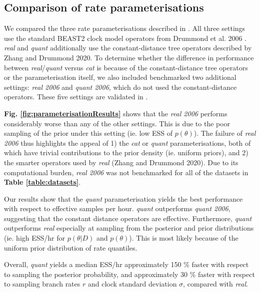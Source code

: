 \documentclass[10pt,letterpaper]{article}
\begin{document}
\subsection*{Comparison of rate parameterisations}

We compared the three rate parameterisations described in \textbf{}. All three settings use the standard BEAST2 clock model operators from Drummond et al. 2006 \cite{drummond2006relaxed}. \textit{real} and \textit{quant} additionally use the constant-distance tree operators described by Zhang and Drummond 2020. To determine whether the difference in performance between \textit{real}/\textit{quant} versus \textit{cat} is because of the constant-distance tree operators or the parameterisation itself, we also included benchmarked two additional settings: \textit{real 2006} and \textit{quant 2006}, which do not used the constant-distance operators. These five settings are validated in \textbf{}.


\textbf{Fig. \ref{fig:parameterisationResults}} shows that the \textit{real 2006} performs considerably worse than any of the other settings. This is due to the poor sampling of the prior under this setting (ie. low ESS of $p(\theta)$). The failure of \textit{real 2006} thus highlights the appeal of 1) the \textit{cat} or \textit{quant} parameterisations, both of which have trivial contributions to the prior density (ie. uniform priors), and 2) the smarter operators used by \textit{real} (Zhang and Drummond 2020). Due to its computational burden, \textit{real 2006} was not benchmarked for all of the datasets in \textbf{Table \ref{table:datasets}}.



Our results show that the \textit{quant} parameterisation yields the best performance with respect to effective samples per hour. \textit{quant} outperforms \textit{quant 2006}, suggesting that the constant distance operators are effective. Furthermore, \textit{quant} outperforms \textit{real} especially at sampling from the posterior and prior distributions (ie. high ESS/hr for $p(\theta|D)$ and $p(\theta)$). This is most likely because of the uniform prior distribution of rate quantiles.

Overall, \textit{quant} yields a median ESS/hr approximately 150 \% faster with respect to sampling the posterior probability, and approximately 30 \% faster with respect to sampling branch rates $r$ and clock standard deviation $\sigma$, compared with \textit{real}.
\end{document}
